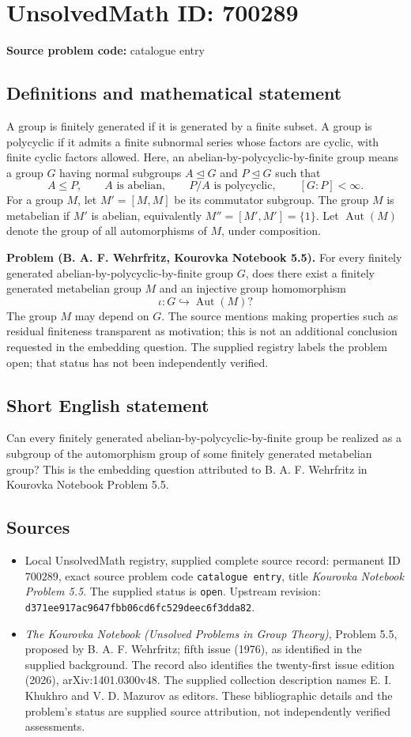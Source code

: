 \documentclass[11pt]{article}
\begin{document}
\section*{UnsolvedMath ID: 700289}
\textbf{Source problem code:} catalogue entry
\subsection{Definitions and mathematical statement}
A group is finitely generated if it is generated by a finite subset. A group is polycyclic if it admits a finite subnormal series whose factors are cyclic, with finite cyclic factors allowed. Here, an abelian-by-polycyclic-by-finite group means a group \(G\) having normal subgroups \(A\trianglelefteq G\) and \(P\trianglelefteq G\) such that
\[
A\leq P,\qquad A\text{ is abelian},\qquad P/A\text{ is polycyclic},\qquad [G:P]<\infty.
\]
For a group \(M\), let \(M'=[M,M]\) be its commutator subgroup. The group \(M\) is metabelian if \(M'\) is abelian, equivalently \(M''=[M',M']=\{1\}\). Let \(\operatorname{Aut}(M)\) denote the group of all automorphisms of \(M\), under composition.

\textbf{Problem (B. A. F. Wehrfritz, Kourovka Notebook 5.5).} For every finitely generated abelian-by-polycyclic-by-finite group \(G\), does there exist a finitely generated metabelian group \(M\) and an injective group homomorphism
\[
\iota:G\hookrightarrow\operatorname{Aut}(M)?
\]
The group \(M\) may depend on \(G\). The source mentions making properties such as residual finiteness transparent as motivation; this is not an additional conclusion requested in the embedding question. The supplied registry labels the problem open; that status has not been independently verified.
\subsection{Short English statement}
Can every finitely generated abelian-by-polycyclic-by-finite group be realized as a subgroup of the automorphism group of some finitely generated metabelian group? This is the embedding question attributed to B. A. F. Wehrfritz in Kourovka Notebook Problem 5.5.
\subsection{Sources}
\begin{itemize}
\item Local UnsolvedMath registry, supplied complete source record: permanent ID \(700289\), exact source problem code \texttt{catalogue entry}, title \emph{Kourovka Notebook Problem 5.5}. The supplied status is \texttt{open}. Upstream revision: \texttt{d371ee917ac9647fbb06cd6fc529deec6f3dda82}.
\item \emph{The Kourovka Notebook (Unsolved Problems in Group Theory)}, Problem 5.5, proposed by B. A. F. Wehrfritz; fifth issue (1976), as identified in the supplied background. The record also identifies the twenty-first issue edition (2026), arXiv:1401.0300v48. The supplied collection description names E. I. Khukhro and V. D. Mazurov as editors. These bibliographic details and the problem's status are supplied source attribution, not independently verified assessments.
\end{itemize}
\end{document}
